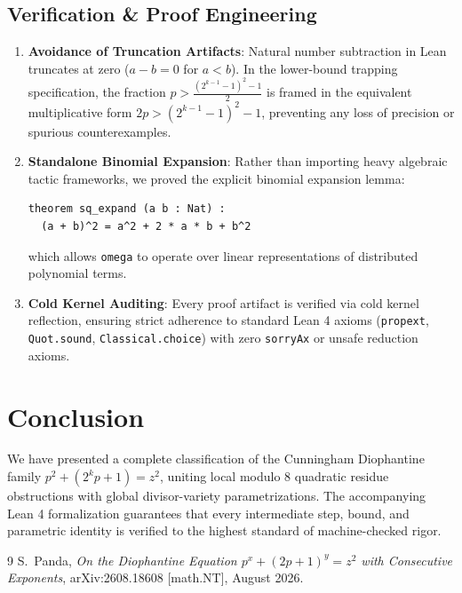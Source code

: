 \documentclass[11pt,a4paper]{article}
\begin{document}
\subsection{Verification & Proof Engineering}
\begin{enumerate}
  \item \textbf{Avoidance of Truncation Artifacts}: Natural number subtraction in Lean truncates at zero ($a - b = 0$ for $a < b$). In the lower-bound trapping specification, the fraction $p > \frac{(2^{k-1}-1)^2 - 1}{2}$ is framed in the equivalent multiplicative form $2p > (2^{k-1}-1)^2 - 1$, preventing any loss of precision or spurious counterexamples.
  \item \textbf{Standalone Binomial Expansion}: Rather than importing heavy algebraic tactic frameworks, we proved the explicit binomial expansion lemma:
  \begin{lstlisting}[language=Lean]
theorem sq_expand (a b : Nat) : 
  (a + b)^2 = a^2 + 2 * a * b + b^2
  \end{lstlisting}
  which allows \texttt{omega} to operate over linear representations of distributed polynomial terms.
  \item \textbf{Cold Kernel Auditing}: Every proof artifact is verified via cold kernel reflection, ensuring strict adherence to standard Lean 4 axioms (\texttt{propext}, \texttt{Quot.sound}, \texttt{Classical.choice}) with zero \texttt{sorryAx} or unsafe reduction axioms.
\end{enumerate}

\section{Conclusion}
We have presented a complete classification of the Cunningham Diophantine family $p^2 + (2^k p + 1) = z^2$, uniting local modulo 8 quadratic residue obstructions with global divisor-variety parametrizations. The accompanying Lean 4 formalization guarantees that every intermediate step, bound, and parametric identity is verified to the highest standard of machine-checked rigor.

\begin{thebibliography}{9}
S.~Panda,
\emph{On the Diophantine Equation $p^x + (2p+1)^y = z^2$ with Consecutive Exponents},
arXiv:2608.18608 [math.NT], August 2026.
\end{thebibliography}
\end{document}
